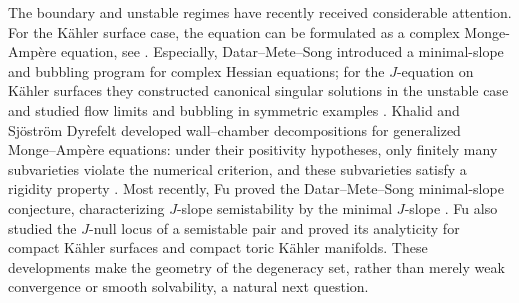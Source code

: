 \documentclass[reqno]{amsart}
\theoremstyle{remark}
\theoremstyle{plain}
\begin{document}
The boundary and unstable regimes have recently received considerable attention. For the K\"ahler surface case, the equation can be formulated as a complex Monge-Amp\`ere equation, see \cite{FLSW14,DMS26,M26a}. Especially, Datar--Mete--Song introduced a minimal-slope and bubbling program for
complex Hessian equations; for the $J$-equation on K\"ahler surfaces
they constructed canonical singular solutions in the unstable case
and studied flow limits and bubbling in symmetric examples
\cite{DMS26}. 
 Khalid and Sj\"ostr\"om Dyrefelt developed
wall--chamber decompositions for generalized Monge--Amp\`ere equations:
under their positivity hypotheses, only finitely many subvarieties
violate the numerical criterion, and these subvarieties satisfy a
rigidity property \cite{KSD26}.  Most recently, Fu proved
the Datar--Mete--Song minimal-slope conjecture, characterizing
$J$-slope semistability by the minimal $J$-slope
\cite{F26}.  Fu also studied the $J$-null locus of a
semistable pair and proved its analyticity for compact K\"ahler
surfaces and compact toric K\"ahler manifolds. These developments make
the geometry of the degeneracy set, rather than merely weak convergence
or smooth solvability, a natural next question.
\end{document}

